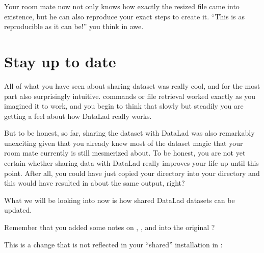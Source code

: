 \sphinxAtStartPar
Your room mate now not only knows how exactly the resized file
came into existence, but he can also reproduce your exact steps to
create it. “This is as reproducible as it can be!” you think in awe.

\sphinxstepscope

\ignorespaces 

\section{Stay up to date}
\label{\detokenize{basics/101-119-sharelocal4:stay-up-to-date}}\label{\detokenize{basics/101-119-sharelocal4:update}}\label{\detokenize{basics/101-119-sharelocal4:sharelocal4}}\label{\detokenize{basics/101-119-sharelocal4:index-0}}\label{\detokenize{basics/101-119-sharelocal4::doc}}
\sphinxAtStartPar
All of what you have seen about sharing dataset was really
cool, and for the most part also surprisingly intuitive.
 commands or file retrieval worked exactly as
you imagined it to work, and you begin to think that slowly but
steadily you are getting a feel about how DataLad really works.

\sphinxAtStartPar
But to be honest, so far, sharing the dataset with DataLad was
also remarkably unexciting given that you already knew most of
the dataset magic that your room mate currently is still
mesmerized about.
To be honest, you are not yet certain whether
sharing data with DataLad really improves your life up
until this point. After all, you could have just copied
your directory into your  directory and
this would have resulted in about the same output, right?

\sphinxAtStartPar
What we will be looking into now is how shared DataLad
datasets can be updated.

\sphinxAtStartPar
Remember that you added some notes on ,
, and  into the
original ?

\sphinxAtStartPar
This is a change that is not reflected in your “shared”
installation in :

